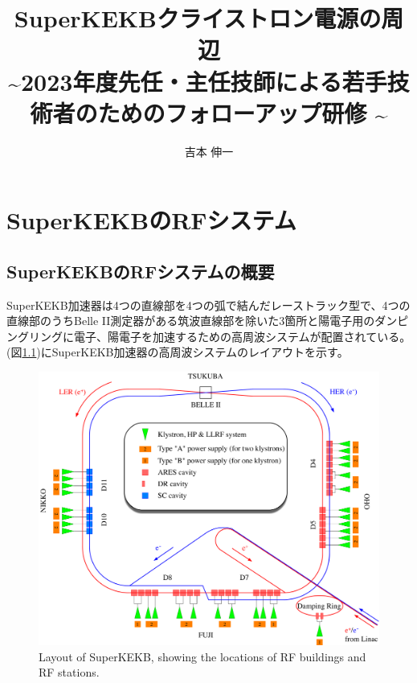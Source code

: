 \documentclass[book,openany]{jlreq}
\theoremstyle{definition}
\begin{document}
\title{\Large{SuperKEKBクライストロン電源の周辺}\\
    \normalsize{\textasciitilde 2023年度先任・主任技師による若手技術者のためのフォローアップ研修 \textasciitilde}}
\author{吉本 伸一}
\maketitle
\tableofcontents
\clearpage


\chapter{SuperKEKBのRFシステム}

\section{SuperKEKBのRFシステムの概要}

SuperKEKB加速器は4つの直線部を4つの弧で結んだレーストラック型で、4つの直線部のうちBelle II測定器がある筑波直線部を除いた3箇所と陽電子用のダンピングリングに電子、陽電子を加速するための高周波システムが配置されている。(図\ref{layout})にSuperKEKB加速器の高周波システムのレイアウトを示す。
%
\begin{figure}[!htt]
    \begin{center}
        \includegraphics[width=\linewidth]{figs/SKEKB-RF.pdf}
        \caption{Layout of SuperKEKB, showing the locations of RF buildings and RF stations.}
        \label{layout}
    \end{center}
\end{figure}
\end{document}
